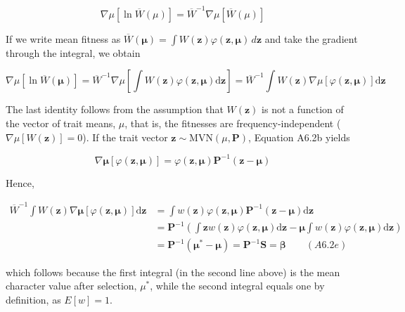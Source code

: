 \documentclass{article}
\begin{document}
\begin{equation}
\nabla\mu[\ln\overline{W}(\mu)]=\overline{W}^{-1}\nabla\mu[\overline{W}(\mu)]
\end{equation}

If we write mean fitness as  $ \overline{W}(\boldsymbol{\mu}) = \int W(\mathbf{z}) \varphi(\mathbf{z}, \boldsymbol{\mu}) \, d\mathbf{z} $ and take the gradient through the integral, we obtain

\begin{equation}
\nabla\mu\left[\ln\overline{W}(\boldsymbol{\mu})\right]=\overline{W}^{-1}\nabla\mu\left[\int W(\mathbf{z})\varphi(\mathbf{z},\boldsymbol{\mu})\mathrm{d}\mathbf{z}\right]=\overline{W}^{-1}\int W(\mathbf{z})\nabla\mu\left[\varphi(\mathbf{z},\boldsymbol{\mu})\right]\mathrm{d}\mathbf{z}
\end{equation}

The last identity follows from the assumption that  $ W(\mathbf{z}) $ is not a function of the vector of trait means,  $ \mu $, that is, the fitnesses are frequency-independent ( $ \nabla \mu \left[ W(\mathbf{z}) \right] = 0 $). If the trait vector  $ \mathbf{z} \sim \text{MVN}(\mu, \mathbf{P}) $, Equation A6.2b yields

\begin{equation}
\nabla\boldsymbol{\mu}\left[\varphi(\mathbf{z},\boldsymbol{\mu})\right]=\varphi(\mathbf{z},\boldsymbol{\mu})\mathbf{P}^{-1}(\mathbf{z}-\boldsymbol{\mu})
\end{equation}

Hence,

\begin{equation}
\begin{aligned}\overline{W}^{-1}\int W(\mathbf{z})\nabla\boldsymbol{\mu}\left[\varphi(\mathbf{z},\boldsymbol{\mu})\right]\mathrm{d}\mathbf{z}&=\int w(\mathbf{z})\varphi(\mathbf{z},\boldsymbol{\mu})\mathbf{P}^{-1}(\mathbf{z}-\boldsymbol{\mu})\mathrm{d}\mathbf{z}\\&=\mathbf{P}^{-1}\left(\int\mathbf{z}w(\mathbf{z})\varphi(\mathbf{z},\boldsymbol{\mu})\mathrm{d}\mathbf{z}-\boldsymbol{\mu}\int w(\mathbf{z})\varphi(\mathbf{z},\boldsymbol{\mu})\mathrm{d}\mathbf{z}\right)\\&=\mathbf{P}^{-1}(\boldsymbol{\mu}^{*}-\boldsymbol{\mu})=\mathbf{P}^{-1}\mathbf{S}=\boldsymbol{\beta}\qquad(A6.2e)\end{aligned}
\end{equation}

which follows because the first integral (in the second line above) is the mean character value after selection,  $ \mu^* $, while the second integral equals one by definition, as  $ E[w] = 1 $.
\end{document}
